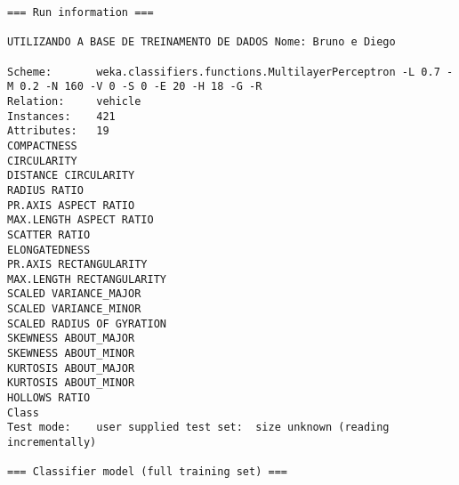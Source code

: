 \documentclass[
	article,			%
	11pt,				%
	oneside,			%
	a4paper,			%
	english,			%
	brazil,				%
	sumario=tradicional
	]{abntex2}
\begin{document}
\begin{lstlisting}
=== Run information ===

UTILIZANDO A BASE DE TREINAMENTO DE DADOS Nome: Bruno e Diego

Scheme:       weka.classifiers.functions.MultilayerPerceptron -L 0.7 -M 0.2 -N 160 -V 0 -S 0 -E 20 -H 18 -G -R
Relation:     vehicle
Instances:    421
Attributes:   19
COMPACTNESS
CIRCULARITY
DISTANCE CIRCULARITY
RADIUS RATIO
PR.AXIS ASPECT RATIO
MAX.LENGTH ASPECT RATIO
SCATTER RATIO
ELONGATEDNESS
PR.AXIS RECTANGULARITY
MAX.LENGTH RECTANGULARITY
SCALED VARIANCE_MAJOR
SCALED VARIANCE_MINOR
SCALED RADIUS OF GYRATION
SKEWNESS ABOUT_MAJOR
SKEWNESS ABOUT_MINOR
KURTOSIS ABOUT_MAJOR
KURTOSIS ABOUT_MINOR
HOLLOWS RATIO
Class
Test mode:    user supplied test set:  size unknown (reading incrementally)

=== Classifier model (full training set) ===


\end{lstlisting}
\end{document}
